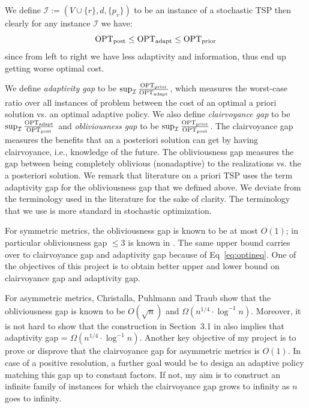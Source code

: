 \documentclass[12pt]{amsart}
\begin{document}
We define $\mathcal{I} := (V \cup \{r\}, d, \{p_v\})$ to be an instance of a stochastic TSP then clearly for any instance $\mathcal{I}$ we have:
\begin{equation}\label{eq:optineq}
\operatorname{OPT}_\mathrm{post} \le \operatorname{OPT}_\mathrm{adapt} \le \operatorname{OPT}_\mathrm{prior}    
\end{equation}
since from left to right we have less adaptivity and information, thus end up getting worse optimal cost.

We define \emph{adaptivity gap} to be $\sup_{\mathcal{I}} \frac{\operatorname{OPT}_\mathrm{prior}}{\operatorname{OPT}_\mathrm{adapt}}$, which measures the worst-case ratio over all instances of problem between the cost of an optimal a priori solution vs. an optimal adaptive policy. We also define \emph{clairvoyance gap} to be $\sup_{\mathcal{I}} \frac{\operatorname{OPT}_\mathrm{adapt}}{\operatorname{OPT}_\mathrm{post}}$ and \emph{obliviousness gap} to be $\sup_{\mathcal{I}} \frac{\operatorname{OPT}_\mathrm{prior}}{\operatorname{OPT}_\mathrm{post}}$. The clairvoyance gap measures the benefits that an a posteriori solution can get by having clairvoyance, i.e., knowledge of the future. The obliviousness gap measures the gap between being completely oblivious (nonadaptive) to the realizations vs. the a posteriori solution. We remark that literature on a priori TSP uses the term adaptivity gap for the obliviousness gap that we defined above. We deviate from the terminology used in the literature \cite{Christalla2025} for the sake of clarity. The terminology that we use is more standard in stochastic optimization.

For symmetric metrics, the obliviousness gap is known to be at most $O(1)$; in particular obliviousness gap $\le 3$ is known in \cite{Shmoys2008}. 
The same upper bound carries over to clairvoyance gap and adaptivity gap because of Eq~\eqref{eq:optineq}. 
One of the objectives of this project is to obtain better upper and lower bound on clairvoyance gap and adaptivity gap.

For asymmetric metrics, Christalla, Puhlmann and Traub \cite{Christalla2025} show that the obliviousness gap is known to be $O(\sqrt{n})$ and $\Omega(n^{1/4} \cdot \log^{-1}n)$. 
Moreover, it is not hard to show that the construction in Section~3.1 in \cite{Christalla2025} also implies that adaptivity gap = $\Omega(n^{1/4} \cdot \log^{-1}n)$. 
Another key objective of my project is to prove or disprove that the clairvoyance gap for asymmetric metrics is $O(1)$. In case of a positive resolution, a further goal would be to design an adaptive policy matching this gap up to constant factors. If not, my aim is to construct an infinite family of instances for which the clairvoyance gap grows to infinity as $n$ goes to infinity.
\end{document}
